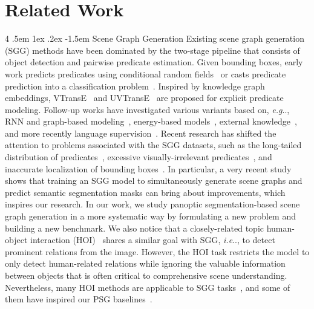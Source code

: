 \documentclass[runningheads]{llncs}
\makeatletter
\renewcommand\paragraph{
  \@startsection{paragraph} {4} {\z@} {.5em \@plus1ex \@minus.2ex} {-1.5em} {\normalfont\normalsize\bfseries} }
\DeclareRobustCommand\onedot{\futurelet\@let@token\@onedot}
\def\@onedot{\ifx\@let@token.\else.\null\fi\xspace}
\def\eg{\emph{e.g}\onedot} \def\Eg{\emph{E.g}\onedot}
\def\ie{\emph{i.e}\onedot} \def\Ie{\emph{I.e}\onedot}
\makeatother
\begin{document}
 \section{Related Work}
\label{sec:related_work}
\paragraph{Scene Graph Generation}
Existing scene graph generation (SGG) methods have been dominated by the two-stage pipeline that consists of object detection and pairwise predicate estimation. Given bounding boxes, early work predicts predicates using conditional random fields~\cite{johnson2015image,dai2017detecting} or casts predicate prediction into a classification problem~\cite{zhang2017relationship,kolesnikov2019detecting,qi2019attentive}. Inspired by knowledge graph embeddings, VTransE~\cite{zhang2017visual} and UVTransE~\cite{hung2020contextual} are proposed for explicit predicate modeling. Follow-up works have investigated various variants based on, \eg, RNN and graph-based modeling~\cite{xu2017scene,zellers2018neural,tang2018vctree,yang2018graph,lin2020gps,chen2019knowledge,li2018factorizable}, energy-based models~\cite{suhail2021energybased}, external knowledge~\cite{tang2018vctree,gu2019scene,zareian2020bridging,ZareianWYC20,lu2016visual}, and more recently language supervision~\cite{zhong2021learning,ye2021linguistic}. Recent research has shifted the attention to problems associated with the SGG datasets, such as the long-tailed distribution of predicates~\cite{tang2020unbiased,desai2021learning}, excessive visually-irrelevant predicates~\cite{liang2019vrr}, and inaccurate localization of bounding boxes~\cite{khandelwal2021segmentation}. In particular, a very recent study~\cite{khandelwal2021segmentation} shows that training an SGG model to simultaneously generate scene graphs and predict semantic segmentation masks can bring about improvements, which inspires our research. In our work, we study panoptic segmentation-based scene graph generation in a more systematic way by formulating a new problem and building a new benchmark.
We also notice that a closely-related topic human-object interaction (HOI)~\cite{gupta2015visual} shares a similar goal with SGG, \ie, to detect prominent relations from the image. However, the HOI task restricts the model to only detect human-related relations while ignoring the valuable information between objects that is often critical to comprehensive scene understanding. Nevertheless, many HOI methods are applicable to SGG tasks~\cite{gkioxari2018detecting,kato2018compositional,chao2018learning,wang2019deep,li2019transferable,zhou2020cascaded,wang2020learning,hou2020visual,li2020detailed,gao2020drg,kim2020uniondet,liu2020amplifying,tamura2021qpic,hou2021affordance,zhang2021mining,wang2022learning,zhang2022efficient}, and some of them have inspired our PSG baselines~\cite{kim2021hotr,zou2021end}.
\end{document}
